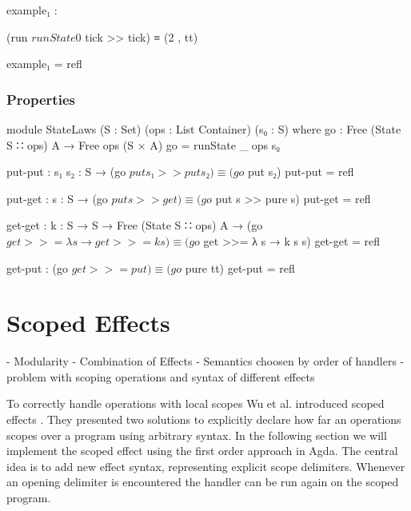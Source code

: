 \begin{center}
\begin{code}
example₁ :
\end{code}
\begin{code}[inline]
 (run $ runState 0 $ tick >> tick) ≡ (2 , tt)
\end{code}
\begin{code}
example₁ = refl
\end{code}
\end{center}

\subsubsection{Properties}

\begin{code}
module StateLaws (S : Set) (ops : List Container) (s₀ : S) where
  go : Free (State S ∷ ops) A → Free ops (S × A)
  go = runState {_} {ops} s₀

  put-put : {s₁ s₂ : S} → (go $ put s₁ >> put s₂) ≡ (go $ put s₂)
  put-put = refl

  put-get : {s : S} → (go $ put s >> get) ≡ (go $ put s >> pure s)
  put-get = refl

  get-get : {k : S → S → Free (State S ∷ ops) A}
    → (go $ get >>= λ s → get >>= k s) ≡ (go $ get >>= λ s → k s s)
  get-get = refl

  get-put : (go $ get >>= put) ≡ (go $ pure tt)
  get-put = refl
\end{code}


\section{Scoped Effects}

- Modularity
- Combination of Effects
- Semantics choosen by order of handlers
- problem with scoping operations and syntax of different effects

To correctly handle operations with local scopes Wu et al. introduced scoped
effects \cite{DBLP:conf/haskell/WuSH14}.
They presented two solutions to explicitly declare how far an operations scopes
over a program using arbitrary syntax.
In the following section we will implement the scoped effect
 using the first order approach in Agda.
The central idea is to add new effect syntax, representing explicit scope
delimiters.
Whenever an opening delimiter is encountered the handler can be run again on the
scoped program.


